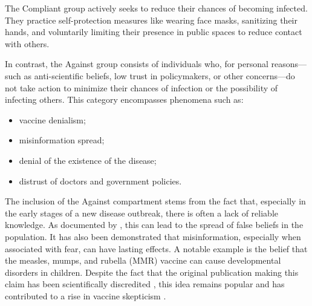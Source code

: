 The Compliant group actively seeks to reduce their chances of becoming infected. They practice self-protection measures like wearing face masks, sanitizing their hands, and voluntarily limiting their presence in public spaces to reduce contact with others.

In contrast, the Against group consists of individuals who, for personal reasons—such as anti-scientific beliefs, low trust in policymakers, or other concerns—do not take action to minimize their chances of infection or the possibility of infecting others. This category encompasses phenomena such as: 
\begin{itemize} 
	\item vaccine denialism; 
	\item misinformation spread; 
	\item denial of the existence of the disease; 
	\item distrust of doctors and government policies. 
\end{itemize}

The inclusion of the Against compartment stems from the fact that, especially in the early stages of a new disease outbreak, there is often a lack of reliable knowledge. As documented by \cite{McCormack_2020}, this can lead to the spread of false beliefs in the population. It has also been demonstrated \cite{owid-vaccine-skepticism} that misinformation, especially when associated with fear, can have lasting effects. A notable example is the belief that the measles, mumps, and rubella (MMR) vaccine can cause developmental disorders in children. Despite the fact that the original publication making this claim has been scientifically discredited \cite{wakefield1998retracted}, this idea remains popular and has contributed to a rise in vaccine skepticism \cite{owid-vaccine-skepticism}.

